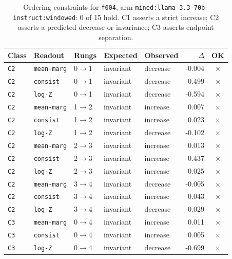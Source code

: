 \documentclass[11pt]{article}
\begin{document}
\begin{table}[htbp]
\centering
\small
\caption{Ordering constraints for \texttt{f004}, arm \texttt{mined:llama-3.3-70b-instruct:windowed}: 0 of 15 hold. C1 asserts a strict increase; C2 asserts a predicted decrease or invariance; C3 asserts endpoint separation.}
\label{tab:ladder-f004-mined-llama-3-3-70b-instruct-windowed}
\begin{tabular}{lllllrc}
\toprule
Class & Readout & Rungs & Expected & Observed & $\Delta$ & OK \\
\midrule
\texttt{C2} & \texttt{mean-marg} & 0$\to$1 & invariant & decrease & -0.004 & $\times$ \\
\texttt{C2} & \texttt{consist} & 0$\to$1 & invariant & decrease & -0.499 & $\times$ \\
\texttt{C2} & \texttt{log-Z} & 0$\to$1 & invariant & decrease & -0.594 & $\times$ \\
\texttt{C2} & \texttt{mean-marg} & 1$\to$2 & invariant & increase & 0.007 & $\times$ \\
\texttt{C2} & \texttt{consist} & 1$\to$2 & invariant & increase & 0.023 & $\times$ \\
\texttt{C2} & \texttt{log-Z} & 1$\to$2 & invariant & decrease & -0.102 & $\times$ \\
\texttt{C2} & \texttt{mean-marg} & 2$\to$3 & invariant & increase & 0.013 & $\times$ \\
\texttt{C2} & \texttt{consist} & 2$\to$3 & invariant & increase & 0.437 & $\times$ \\
\texttt{C2} & \texttt{log-Z} & 2$\to$3 & invariant & increase & 0.025 & $\times$ \\
\texttt{C2} & \texttt{mean-marg} & 3$\to$4 & invariant & decrease & -0.005 & $\times$ \\
\texttt{C2} & \texttt{consist} & 3$\to$4 & invariant & increase & 0.043 & $\times$ \\
\texttt{C2} & \texttt{log-Z} & 3$\to$4 & invariant & decrease & -0.029 & $\times$ \\
\texttt{C3} & \texttt{mean-marg} & 0$\to$4 & invariant & increase & 0.011 & $\times$ \\
\texttt{C3} & \texttt{consist} & 0$\to$4 & invariant & increase & 0.005 & $\times$ \\
\texttt{C3} & \texttt{log-Z} & 0$\to$4 & invariant & decrease & -0.699 & $\times$ \\
\bottomrule
\end{tabular}
\end{table}
\end{document}
